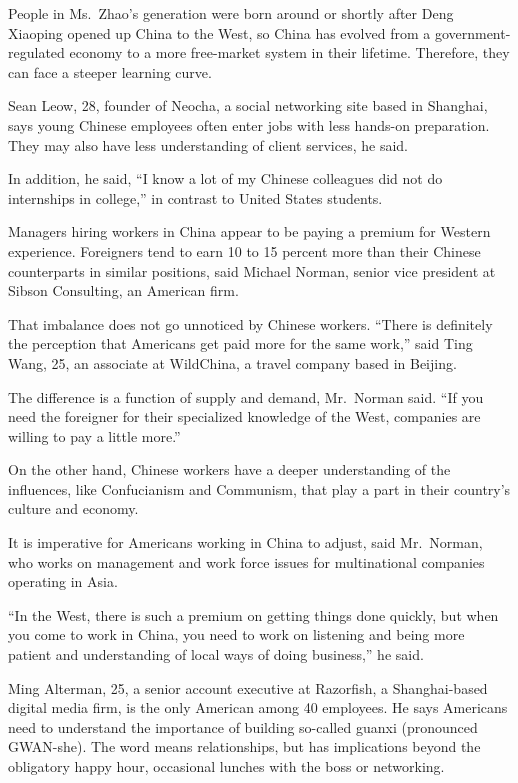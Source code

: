 ﻿\documentclass[12pt]{article}
\begin{document}
People in Ms.~Zhao's generation were born around or shortly after Deng Xiaoping opened up China to
the West, so China has evolved from a government-regulated economy to a more free-market system in
their lifetime. Therefore, they can face a steeper learning curve.

Sean Leow, 28, founder of Neocha, a social networking site based in Shanghai, says young Chinese
employees often enter jobs with less hands-on preparation. They may also have less understanding of
client services, he said.

In addition, he said, ``I know a lot of my Chinese colleagues did not do internships in college,''
in contrast to United States students.

Managers hiring workers in China appear to be paying a premium for Western experience. Foreigners
tend to earn 10 to 15 percent more than their Chinese counterparts in similar positions, said
Michael Norman, senior vice president at Sibson Consulting, an American firm.

That imbalance does not go unnoticed by Chinese workers. ``There is definitely the perception that
Americans get paid more for the same work,'' said Ting Wang, 25, an associate at WildChina, a travel
company based in Beijing.

The difference is a function of supply and demand, Mr.~Norman said. ``If you need the foreigner for
their specialized knowledge of the West, companies are willing to pay a little more.''

On the other hand, Chinese workers have a deeper understanding of the influences, like Confucianism
and Communism, that play a part in their country's culture and economy.

It is imperative for Americans working in China to adjust, said Mr.~Norman, who works on management
and work force issues for multinational companies operating in Asia.

``In the West, there is such a premium on getting things done quickly, but when you come to work in
China, you need to work on listening and being more patient and understanding of local ways of doing
business,'' he said.

Ming Alterman, 25, a senior account executive at Razorfish, a Shanghai-based digital media firm, is
the only American among 40 employees. He says Americans need to understand the importance of
building so-called guanxi (pronounced GWAN-she). The word means relationships, but has implications
beyond the obligatory happy hour, occasional lunches with the boss or networking.
\end{document}
